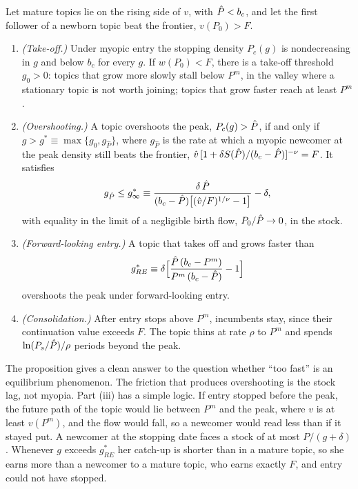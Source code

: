 \begin{proposition}\label{prop:toofast}
Let mature topics lie on the rising side of $v$, with $\hat P<b_c$, and let the
first follower of a newborn topic beat the frontier, $v(P_0)>F$.
\begin{enumerate}[label=(\roman*)]
\item \emph{(Take-off.)} Under myopic entry the stopping density $P_c(g)$ is nondecreasing in $g$ and below $b_c$ for every $g$. If $w(P_0)<F$, there is a take-off threshold $g_0>0$: topics that grow more slowly stall below $P^m$, in the valley where a stationary topic is not worth joining; topics that grow faster reach at least $P^m$.
\item \emph{(Overshooting.)} A topic overshoots the peak, $P_c(g)>\hat P$, if and only if $g>g^*\equiv\max\{g_0,g_{\hat P}\}$, where $g_{\hat P}$ is the rate at which a myopic newcomer at the peak density still beats the frontier, $\hat v\,[1+\delta S(\hat P)/(b_c-\hat P)]^{-\nu}=F$. It satisfies
\begin{equation}\label{eq:gstar}
g_{\hat P}\le g^*_\infty\equiv\frac{\delta\,\hat P}{(b_c-\hat P)\big[(\hat v/F)^{1/\nu}-1\big]}-\delta,
\end{equation}
with equality in the limit of a negligible birth flow, $P_0/\hat P\to0$, in the stock.
\item \emph{(Forward-looking entry.)} A topic that takes off and grows faster than
\[
g^*_{RE}\equiv\delta\Big[\frac{\hat P\,(b_c-P^m)}{P^m\,(b_c-\hat P)}-1\Big]
\]
overshoots the peak under forward-looking entry.
\item \emph{(Consolidation.)} After entry stops above $P^m$, incumbents stay, since their continuation value exceeds $F$. The topic thins at rate $\rho$ to $P^m$ and spends $\ln(P_s/\hat P)/\rho$ periods beyond the peak.
\end{enumerate}
\end{proposition}

The proposition gives a clean answer to the question whether ``too fast'' is an
equilibrium phenomenon. The friction that produces overshooting is the stock
lag, not myopia. Part (iii) has a simple logic. If entry stopped before the
peak, the future path of the topic would lie between $P^m$ and the peak, where
$v$ is at least $v(P^m)$, and the flow would fall, so a newcomer would read
less than if it stayed put. A newcomer at the stopping date faces a stock of at
most $P/(g+\delta)$. Whenever $g$ exceeds $g^*_{RE}$ her catch-up is shorter
than in a mature topic, so she earns more than a newcomer to a mature topic,
who earns exactly $F$, and entry could not have stopped.

